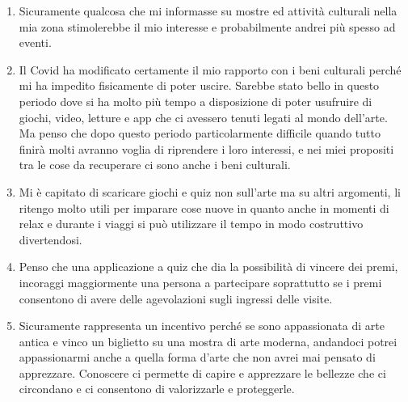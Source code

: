 \documentclass{article}
\begin{document}
\begin{enumerate}
\item Sicuramente qualcosa che mi informasse su mostre ed attività culturali nella mia zona stimolerebbe il mio interesse e probabilmente andrei più spesso ad eventi.
\item Il Covid ha modificato certamente il mio rapporto con i beni culturali perché mi ha impedito fisicamente di poter uscire. Sarebbe stato bello in questo periodo dove si ha molto più tempo a disposizione di poter usufruire di giochi, video, letture e app che ci avessero tenuti legati al mondo dell’arte. Ma penso che dopo questo periodo particolarmente difficile quando tutto finirà molti avranno voglia di riprendere i loro interessi, e nei miei propositi tra le cose da recuperare ci sono anche i beni culturali.
\item Mi è capitato di scaricare giochi e quiz non sull’arte ma su altri argomenti, li ritengo molto utili per imparare cose nuove in quanto anche in momenti di relax e durante i viaggi si può utilizzare il tempo in modo costruttivo divertendosi.
\item Penso che una applicazione a quiz che dia la possibilità di vincere dei premi, incoraggi maggiormente una persona a partecipare soprattutto se i premi consentono di avere delle agevolazioni sugli ingressi delle visite.
\item Sicuramente rappresenta un incentivo perché se sono appassionata di arte antica e vinco un biglietto su una mostra di arte moderna, andandoci potrei appassionarmi anche a quella forma d'arte che non avrei mai pensato di apprezzare. Conoscere ci permette di capire e apprezzare le bellezze che ci circondano e ci consentono di valorizzarle e proteggerle.
\end{enumerate}
\end{document}
